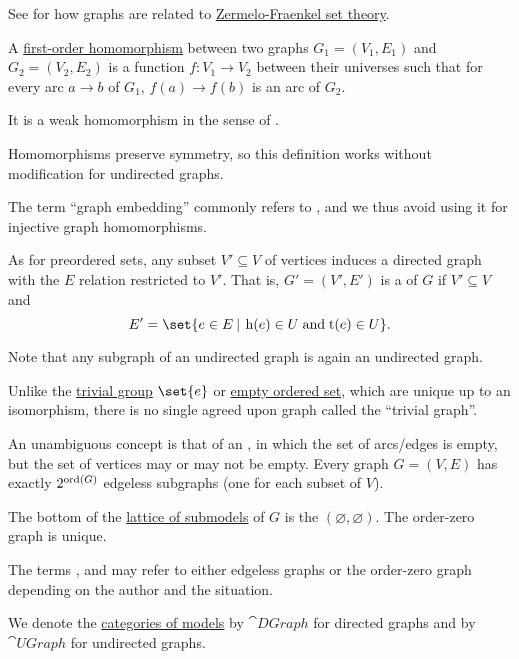 \begin{definition}
\begin{thmenum}[resume=def:graph]
    See  for how graphs are related to \hyperref[def:zfc]{Zermelo-Fraenkel set theory}.

     A \hyperref[def:first_order_homomorphism]{first-order homomorphism} between two graphs \( G_1 = (V_1, E_1) \) and \( G_2 = (V_2, E_2) \) is a function \( f: V_1 \to V_2 \) between their universes such that for every arc \( a \to b \) of \( G_1 \), \( f(a) \to f(b) \) is an arc of \( G_2 \).

    It is a weak homomorphism in the sense of .

    Homomorphisms preserve symmetry, so this definition works without modification for undirected graphs.

    The term \enquote{graph embedding} commonly refers to , and we thus avoid using it for injective graph homomorphisms.

     As for preordered sets, any subset \( V' \subseteq V \) of vertices induces a directed graph with the \( E \) relation restricted to \( V' \). That is, \( G' = (V', E') \) is a  of \( G \) if \( V' \subseteq V \) and
    \begin{equation*}
      E' = \set{ e \in E \given \head(e) \in U \T{and} \tail(e) \in U }.
    \end{equation*}

    Note that any subgraph of an undirected graph is again an undirected graph.

     Unlike the \hyperref[def:group/trivial]{trivial group} \( \set{ e } \) or \hyperref[def:partially_ordered_set/trivial]{empty ordered set}, which are unique up to an isomorphism, there is no single agreed upon graph called the \enquote{trivial graph}.

    An unambiguous concept is that of an , in which the set of arcs/edges is empty, but the set of vertices may or may not be empty. Every graph \( G = (V, E) \) has exactly \( 2^{\operatorname{ord}(G)} \) edgeless subgraphs (one for each subset of \( V \)).

    The bottom of the \hyperref[thm:substructures_form_complete_lattice]{lattice of submodels} of \( G \) is the  \( (\varnothing, \varnothing) \). The order-zero graph is unique.

    The terms ,  and  may refer to either edgeless graphs or the order-zero graph depending on the author and the situation.

     We denote the \hyperref[def:category_of_first_order_models]{categories of models} by \( \cat{DGraph} \) for directed graphs and by \( \cat{UGraph} \) for undirected graphs.
  \end{thmenum}
\end{definition}

